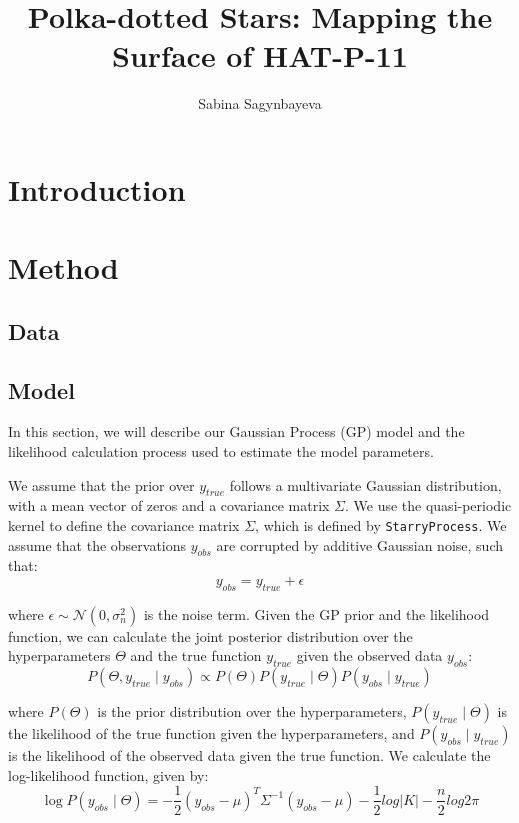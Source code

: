 \documentclass[twocolumn]{aastex631}
\begin{document}
\title{Polka-dotted Stars: Mapping the Surface of HAT-P-11}

\author{Sabina Sagynbayeva}

\begin{abstract}
   
\end{abstract}

\section{Introduction}
\label{sec:intro}

\section{Method}
\subsection{Data}
\subsection{Model}
In this section, we will describe our Gaussian Process (GP) model and the likelihood calculation process used to estimate the model parameters. 

We assume that the prior over $y_{true}$ follows a multivariate Gaussian distribution, with a mean vector of zeros and a covariance matrix $\Sigma$. We use the quasi-periodic kernel to define the covariance matrix $\Sigma$, which is defined by \texttt{StarryProcess}.
We assume that the observations $y_{obs}$ are corrupted by additive Gaussian noise, such that:
\begin{equation}
    y_{obs} = y_{true} + \epsilon
\end{equation}

where $\epsilon \sim \mathcal{N}(0, \sigma_n^2)$ is the noise term. Given the GP prior and the likelihood function, we can calculate the joint posterior distribution over the hyperparameters $\Theta$ and the true function $y_{true}$ given the observed data $y_{obs}$:
\begin{equation}
    P(\Theta, y_{true} \mid y_{obs}) \propto P(\Theta) P(y_{true} \mid \Theta) P(y_{obs} \mid y_{true})
\end{equation}

where $P(\Theta)$ is the prior distribution over the hyperparameters, $P(y_{true} \mid \Theta)$ is the likelihood of the true function given the hyperparameters, and $P(y_{obs} \mid y_{true})$ is the likelihood of the observed data given the true function.
We calculate the log-likelihood function, given by:
\begin{equation}
    \log{P(y_{obs} \mid \Theta)} = -\frac{1}{2} (y_{obs} - \mu)^T \Sigma^{-1} (y_{obs} - \mu) -\frac{1}{2} log |K| - \frac{n}{2} log 2\pi
\end{equation}
\end{document}
